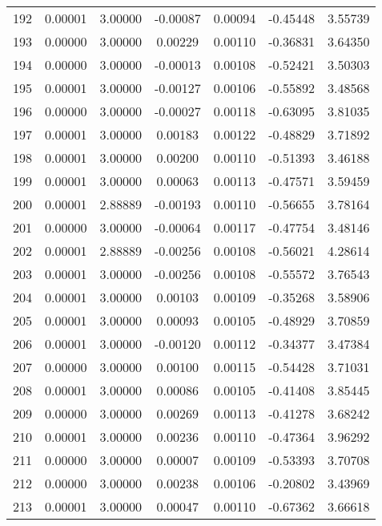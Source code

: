 \begin{longtable}{c c c c c c c}
192 &  0.00001 &      3.00000 & -0.00087 &   0.00094 &  -0.45448 &   3.55739 \\
193 &  0.00000 &      3.00000 &  0.00229 &   0.00110 &  -0.36831 &   3.64350 \\
194 &  0.00000 &      3.00000 & -0.00013 &   0.00108 &  -0.52421 &   3.50303 \\
195 &  0.00001 &      3.00000 & -0.00127 &   0.00106 &  -0.55892 &   3.48568 \\
196 &  0.00000 &      3.00000 & -0.00027 &   0.00118 &  -0.63095 &   3.81035 \\
197 &  0.00001 &      3.00000 &  0.00183 &   0.00122 &  -0.48829 &   3.71892 \\
198 &  0.00001 &      3.00000 &  0.00200 &   0.00110 &  -0.51393 &   3.46188 \\
199 &  0.00001 &      3.00000 &  0.00063 &   0.00113 &  -0.47571 &   3.59459 \\
200 &  0.00001 &      2.88889 & -0.00193 &   0.00110 &  -0.56655 &   3.78164 \\
201 &  0.00000 &      3.00000 & -0.00064 &   0.00117 &  -0.47754 &   3.48146 \\
202 &  0.00001 &      2.88889 & -0.00256 &   0.00108 &  -0.56021 &   4.28614 \\
203 &  0.00001 &      3.00000 & -0.00256 &   0.00108 &  -0.55572 &   3.76543 \\
204 &  0.00001 &      3.00000 &  0.00103 &   0.00109 &  -0.35268 &   3.58906 \\
205 &  0.00001 &      3.00000 &  0.00093 &   0.00105 &  -0.48929 &   3.70859 \\
206 &  0.00001 &      3.00000 & -0.00120 &   0.00112 &  -0.34377 &   3.47384 \\
207 &  0.00000 &      3.00000 &  0.00100 &   0.00115 &  -0.54428 &   3.71031 \\
208 &  0.00001 &      3.00000 &  0.00086 &   0.00105 &  -0.41408 &   3.85445 \\
209 &  0.00000 &      3.00000 &  0.00269 &   0.00113 &  -0.41278 &   3.68242 \\
210 &  0.00001 &      3.00000 &  0.00236 &   0.00110 &  -0.47364 &   3.96292 \\
211 &  0.00000 &      3.00000 &  0.00007 &   0.00109 &  -0.53393 &   3.70708 \\
212 &  0.00000 &      3.00000 &  0.00238 &   0.00106 &  -0.20802 &   3.43969 \\
213 &  0.00001 &      3.00000 &  0.00047 &   0.00110 &  -0.67362 &   3.66618 \\

\end{longtable}
